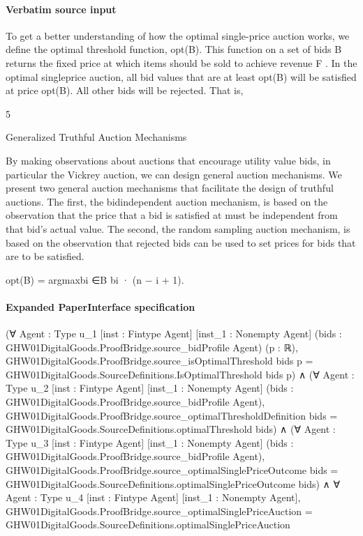 \documentclass[10pt]{article}
\begin{document}
\paragraph{Verbatim source input}
\begin{ReviewVerbatim}
To get a better understanding of how the optimal single-price auction works, we define the optimal
threshold function, opt(B). This function on a set of
bids B returns the fixed price at which items should
be sold to achieve revenue F . In the optimal singleprice auction, all bid values that are at least opt(B)
will be satisfied at price opt(B). All other bids will
be rejected. That is,

5

Generalized Truthful Auction Mechanisms

By making observations about auctions that encourage utility value bids, in particular the Vickrey auction, we can design general auction mechanisms. We
present two general auction mechanisms that facilitate the design of truthful auctions. The first, the bidindependent auction mechanism, is based on the observation that the price that a bid is satisfied at must
be independent from that bid’s actual value. The
second, the random sampling auction mechanism, is
based on the observation that rejected bids can be
used to set prices for bids that are to be satisfied.

opt(B) = argmaxbi ∈B bi · (n − i + 1).
\end{ReviewVerbatim}


\paragraph{Expanded PaperInterface specification}
\begin{ReviewVerbatim}
(∀ {Agent : Type u_1} [inst : Fintype Agent] [inst_1 : Nonempty Agent]
    (bids : GHW01DigitalGoods.ProofBridge.source_bidProfile Agent) (p : ℝ),
    GHW01DigitalGoods.ProofBridge.source_isOptimalThreshold bids p =
      GHW01DigitalGoods.SourceDefinitions.IsOptimalThreshold bids p) ∧
  (∀ {Agent : Type u_2} [inst : Fintype Agent] [inst_1 : Nonempty Agent]
      (bids : GHW01DigitalGoods.ProofBridge.source_bidProfile Agent),
      GHW01DigitalGoods.ProofBridge.source_optimalThresholdDefinition bids =
        GHW01DigitalGoods.SourceDefinitions.optimalThreshold bids) ∧
    (∀ {Agent : Type u_3} [inst : Fintype Agent] [inst_1 : Nonempty Agent]
        (bids : GHW01DigitalGoods.ProofBridge.source_bidProfile Agent),
        GHW01DigitalGoods.ProofBridge.source_optimalSinglePriceOutcome bids =
          GHW01DigitalGoods.SourceDefinitions.optimalSinglePriceOutcome bids) ∧
      ∀ {Agent : Type u_4} [inst : Fintype Agent] [inst_1 : Nonempty Agent],
        GHW01DigitalGoods.ProofBridge.source_optimalSinglePriceAuction =
          GHW01DigitalGoods.SourceDefinitions.optimalSinglePriceAuction
\end{ReviewVerbatim}
\end{document}
